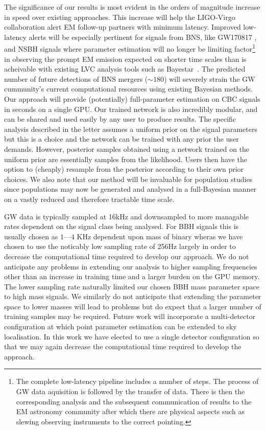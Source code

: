 \documentclass[%
showpacs,
 amsmath,amssymb,
 aps,
 twocolumn,
 prl,
 reprint,
floatfix,
]{revtex4-1}
\begin{document}
%
%
The significance of our results is most evident in the orders of magnitude
increase in speed over existing approaches. This increase will help the
LIGO-Virgo collaboration alert \ac{EM} follow-up partners with minimum latency.
Improved low-latency alerts will be especially pertinent for signals from
\ac{BNS}, like GW170817 \cite{PhysRevLett.119.161101}, and \ac{NSBH} signals where
parameter estimation will no longer be limiting factor\footnote{The complete
low-latency pipeline includes a number of steps. The process of \ac{GW} data
aquisition is followed by the transfer of data. There is then the corresponding
analysis and the subsequent communication of results to the \ac{EM} astronomy
community after which there are physical aspects such as slewing observing
instruments to the correct pointing.} in observing the prompt \ac{EM} emission
expected on shorter time scales than is acheivable with existing \ac{LVC}
analysis tools such as Bayestar~\cite{2016PhRvD..93b4013S}. The predicted number of
future detections of \ac{BNS} mergers ($\sim 180$) will severely
strain the \ac{GW} cummunity's current computational resources using existing
Bayesian methods. Our approach will provide (potentially) full-parameter
estimation on \ac{CBC} signals in seconds on a single \ac{GPU}. Our trained
network is also incredibly modular, and can be shared and used easily by any
user to produce results. The specific analysis described in the letter assumes
a uniform prior on the signal parameters but this is a choice and the network
can be trained with any prior the user demands. However, posterior samples
obtained using a network trained on the uniform prior are essentially samples
from the likelihood. Users then have the option to (cheaply) resample from the
posterior according to their own prior choices. We also note that our method
will be invaluable for population studies since populations may now be
generated and analysed in a full-Bayesian manner on a vastly reduced and
therefore tractable time scale. 

%
%
\ac{GW} data is typically sampled at 16kHz and downsampled to more managable
rates dependent on the signal class being analysed. For \ac{BBH} signals this
is usually chosen as $1$---$4$ KHz dependent upon mass of binary wheras we have
chosen to use the noticably low sampling rate of 256Hz largely in order to
decrease the computational time required to develop our approach. We do not
anticipate any problems in extending our analysis to higher sampling
frequencies other than an increase in training time and a larger burden on the
\ac{GPU} memory. The lower sampling rate naturally limited our chosen \ac{BBH}
mass parameter space to high mass signals. We similarly do not anticipate that
extending the parameter space to lower masses will lead to problems but do
expect that a larger number of training samples may be required. Future work
will incorporate a multi-detector configuration at which point parameter
estimation can be extended to sky localisation. In this work we have elected to
use a single detector configuration so that we may again decrease the
computational time required to develop the approach.
\end{document}
